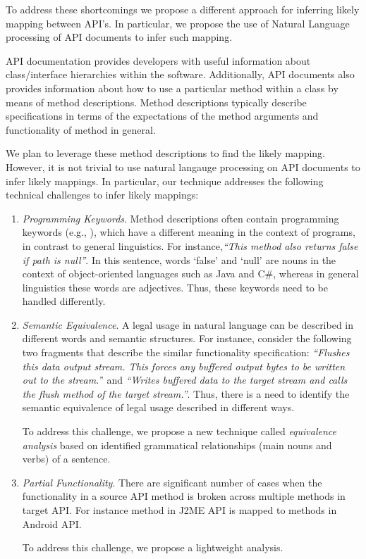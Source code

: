 To address these shortcomings we propose a different approach for inferring likely mapping between API's. In particular, we propose the use of Natural Language processing of API documents to infer such mapping.  

  
API documentation provides developers with useful information about class/interface hierarchies within the software. Additionally, API documents also provides information about how to use a particular method within a class by means of method descriptions. Method descriptions typically describe specifications in terms of the expectations of the method arguments and functionality of method in general.


We plan to leverage these method descriptions to find the likely mapping. However, it is not trivial to use natural langauge processing on API documents to infer likely mappings. In particular, our technique addresses the following technical challenges to infer likely mappings:

\begin{enumerate}
	\item \textit{Programming Keywords}. Method descriptions often contain programming keywords (e.g., ), which have a different meaning in the context of programs, in contrast to general linguistics. For instance,\textit{``This method also returns false if path is null''}. In this sentence, words `false' and `null' are nouns in the context of object-oriented languages such as Java and C\#, whereas in general linguistics these words are adjectives. Thus, these keywords need to be handled differently.
		
	\item \textit{Semantic Equivalence}. A legal usage in natural language can be described in different words and semantic structures. For instance, consider the following two fragments that describe the similar functionality specification: \textit{``Flushes this data output stream. This forces any buffered output bytes to be written out to the stream.'}' and \textit{``Writes buffered data to the target stream and calls the flush method of the target stream.''}. Thus, there is a need to identify the semantic equivalence of legal usage described in different ways.
		
		To address this challenge, we propose a new technique called \textit{equivalence analysis} based on identified grammatical relationships (main nouns and verbs) of a sentence.
	
	\item \textit {Partial Functionality}. There are significant number of cases when the functionality in a source API method is broken across multiple methods in target API. For instance  method in J2ME API is mapped to methods in Android API.
	
		To address this challenge, we propose a lightweight  analysis.
		
\end{enumerate}





